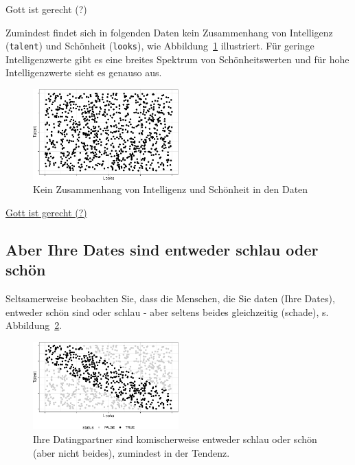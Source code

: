 \documentclass[
  a4paper,
  DIV=11]{scrreprt}
\theoremstyle{definition}
\theoremstyle{remark}
\begin{document}
Gott ist gerecht (?)

Zumindest findet sich in folgenden Daten kein Zusammenhang von
Intelligenz (\texttt{talent}) und Schönheit (\texttt{looks}), wie
Abbildung~\ref{fig-iq-schoen} illustriert. Für geringe Intelligenzwerte
gibt es eine breites Spektrum von Schönheitswerten und für hohe
Intelligenzwerte sieht es genauso aus.

\begin{figure}

{\centering \includegraphics[width=0.5\textwidth,height=\textheight]{./kausal_files/figure-pdf/fig-iq-schoen-1.pdf}

}

\caption{\label{fig-iq-schoen}Kein Zusammenhang von Intelligenz und
Schönheit in den Daten}

\end{figure}

\href{https://twitter.com/TheTweetOfGod/status/1462594155176026123}{Gott
ist gerecht (?)}

\hypertarget{aber-ihre-dates-sind-entweder-schlau-oder-schuxf6n}{%
\subsection{Aber Ihre Dates sind entweder schlau oder
schön}\label{aber-ihre-dates-sind-entweder-schlau-oder-schuxf6n}}

Seltsamerweise beobachten Sie, dass die Menschen, die Sie daten (Ihre
Dates), entweder schön sind oder schlau - aber seltens beides
gleichzeitig (schade), s. Abbildung~\ref{fig-dates-beauty}.

\begin{figure}

{\centering \includegraphics[width=0.5\textwidth,height=\textheight]{./kausal_files/figure-pdf/fig-dates-beauty-1.pdf}

}

\caption{\label{fig-dates-beauty}Ihre Datingpartner sind komischerweise
entweder schlau oder schön (aber nicht beides), zumindest in der
Tendenz.}

\end{figure}
\end{document}
